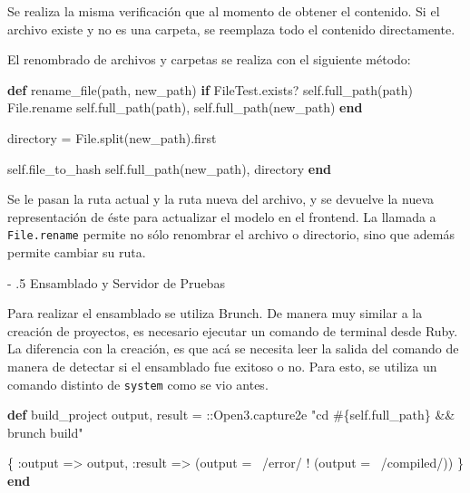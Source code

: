\documentclass[12pt,titlepage,]{article}
\makeatletter
\newenvironment{Shaded}{}{}
\newcommand{\KeywordTok}[1]{\textcolor[rgb]{0.00,0.44,0.13}{\textbf{{#1}}}}
\newcommand{\DataTypeTok}[1]{\textcolor[rgb]{0.56,0.13,0.00}{{#1}}}
\newcommand{\DecValTok}[1]{\textcolor[rgb]{0.25,0.63,0.44}{{#1}}}
\newcommand{\StringTok}[1]{\textcolor[rgb]{0.25,0.44,0.63}{{#1}}}
\newcommand{\OtherTok}[1]{\textcolor[rgb]{0.00,0.44,0.13}{{#1}}}
\newcommand{\NormalTok}[1]{{#1}}
\renewcommand\paragraph{%
   \@startsection{paragraph}{4}{0mm}%
      {-\baselineskip}%
      {.5\baselineskip}%
      {\normalfont\normalsize\bfseries}}
\makeatother
\begin{document}
Se realiza la misma verificación que al momento de obtener el contenido.
Si el archivo existe y no es una carpeta, se reemplaza todo el contenido
directamente.

El renombrado de archivos y carpetas se realiza con el siguiente método:

\begin{Shaded}
\begin{Highlighting}[]
\KeywordTok{def} \NormalTok{rename_file(path, new_path)}
  \KeywordTok{if} \DataTypeTok{FileTest}\NormalTok{.exists? }\DecValTok{self}\NormalTok{.full_path(path)}
    \DataTypeTok{File}\NormalTok{.rename }\DecValTok{self}\NormalTok{.full_path(path), }\DecValTok{self}\NormalTok{.full_path(new_path)}
  \KeywordTok{end}

  \NormalTok{directory = }\DataTypeTok{File}\NormalTok{.split(new_path).first}

  \DecValTok{self}\NormalTok{.file_to_hash }\DecValTok{self}\NormalTok{.full_path(new_path), directory}
\KeywordTok{end}
\end{Highlighting}
\end{Shaded}

Se le pasan la ruta actual y la ruta nueva del archivo, y se devuelve la
nueva representación de éste para actualizar el modelo en el frontend.
La llamada a \texttt{File.rename} permite no sólo renombrar el archivo o
directorio, sino que además permite cambiar su ruta.

\paragraph{Ensamblado y Servidor de Pruebas}

Para realizar el ensamblado se utiliza Brunch. De manera muy similar a
la creación de proyectos, es necesario ejecutar un comando de terminal
desde Ruby. La diferencia con la creación, es que acá se necesita leer
la salida del comando de manera de detectar si el ensamblado fue exitoso
o no. Para esto, se utiliza un comando distinto de \texttt{system} como
se vio antes.

\begin{Shaded}
\begin{Highlighting}[]
\KeywordTok{def} \NormalTok{build_project}
  \NormalTok{output, result = ::}\DataTypeTok{Open3}\NormalTok{.capture2e }\StringTok{"cd }\OtherTok{#\{}\DecValTok{self}\NormalTok{.full_path}\OtherTok{\}}\StringTok{ && brunch build"}

  \NormalTok{\{}
    \StringTok{:output} \NormalTok{=> output,}
    \StringTok{:result} \NormalTok{=> (output =~ }\OtherTok{/error/} \NormalTok{\textbar{}\textbar{} ! (output =~ }\OtherTok{/compiled/}\NormalTok{))}
  \NormalTok{\}}
\KeywordTok{end}
\end{Highlighting}
\end{Shaded}
\end{document}
